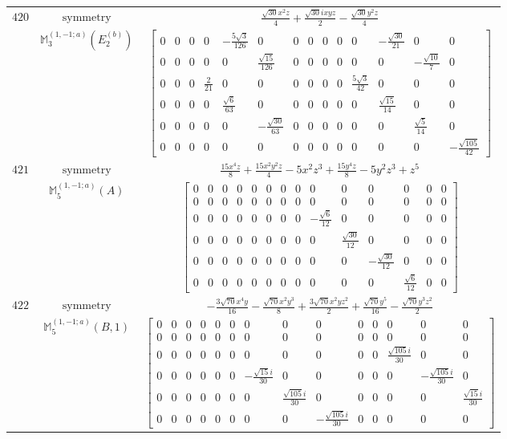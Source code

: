 \documentclass[fleqn,8pt,landscape]{jsarticle}
\begin{document}
\begin{longtable}{ccc}
$ 420 $ & $ \text{symmetry} $ & $ \frac{\sqrt{30} x^{2} z}{4} + \frac{\sqrt{30} i x y z}{2} - \frac{\sqrt{30} y^{2} z}{4} $ \\
$  $ & $ \mathbb{M}_{3}^{(1,-1;a)}(E_{2}^{(b)}) $ & $ \begin{bmatrix} 0 & 0 & 0 & 0 & - \frac{5 \sqrt{3}}{126} & 0 & 0 & 0 & 0 & 0 & 0 & - \frac{\sqrt{30}}{21} & 0 & 0 \\ 0 & 0 & 0 & 0 & 0 & \frac{\sqrt{15}}{126} & 0 & 0 & 0 & 0 & 0 & 0 & - \frac{\sqrt{10}}{7} & 0 \\ 0 & 0 & 0 & \frac{2}{21} & 0 & 0 & 0 & 0 & 0 & 0 & \frac{5 \sqrt{3}}{42} & 0 & 0 & 0 \\ 0 & 0 & 0 & 0 & \frac{\sqrt{6}}{63} & 0 & 0 & 0 & 0 & 0 & 0 & \frac{\sqrt{15}}{14} & 0 & 0 \\ 0 & 0 & 0 & 0 & 0 & - \frac{\sqrt{30}}{63} & 0 & 0 & 0 & 0 & 0 & 0 & \frac{\sqrt{5}}{14} & 0 \\ 0 & 0 & 0 & 0 & 0 & 0 & 0 & 0 & 0 & 0 & 0 & 0 & 0 & - \frac{\sqrt{105}}{42} \end{bmatrix} $ \\ \hline
$ 421 $ & $ \text{symmetry} $ & $ \frac{15 x^{4} z}{8} + \frac{15 x^{2} y^{2} z}{4} - 5 x^{2} z^{3} + \frac{15 y^{4} z}{8} - 5 y^{2} z^{3} + z^{5} $ \\
$  $ & $ \mathbb{M}_{5}^{(1,-1;a)}(A) $ & $ \begin{bmatrix} 0 & 0 & 0 & 0 & 0 & 0 & 0 & 0 & 0 & 0 & 0 & 0 & 0 & 0 \\ 0 & 0 & 0 & 0 & 0 & 0 & 0 & 0 & 0 & 0 & 0 & 0 & 0 & 0 \\ 0 & 0 & 0 & 0 & 0 & 0 & 0 & 0 & - \frac{\sqrt{6}}{12} & 0 & 0 & 0 & 0 & 0 \\ 0 & 0 & 0 & 0 & 0 & 0 & 0 & 0 & 0 & \frac{\sqrt{30}}{12} & 0 & 0 & 0 & 0 \\ 0 & 0 & 0 & 0 & 0 & 0 & 0 & 0 & 0 & 0 & - \frac{\sqrt{30}}{12} & 0 & 0 & 0 \\ 0 & 0 & 0 & 0 & 0 & 0 & 0 & 0 & 0 & 0 & 0 & \frac{\sqrt{6}}{12} & 0 & 0 \end{bmatrix} $ \\ \hline
$ 422 $ & $ \text{symmetry} $ & $ - \frac{3 \sqrt{70} x^{4} y}{16} - \frac{\sqrt{70} x^{2} y^{3}}{8} + \frac{3 \sqrt{70} x^{2} y z^{2}}{2} + \frac{\sqrt{70} y^{5}}{16} - \frac{\sqrt{70} y^{3} z^{2}}{2} $ \\
$  $ & $ \mathbb{M}_{5}^{(1,-1;a)}(B,1) $ & $ \begin{bmatrix} 0 & 0 & 0 & 0 & 0 & 0 & 0 & 0 & 0 & 0 & 0 & 0 & 0 & 0 \\ 0 & 0 & 0 & 0 & 0 & 0 & 0 & 0 & 0 & 0 & 0 & 0 & 0 & 0 \\ 0 & 0 & 0 & 0 & 0 & 0 & 0 & 0 & 0 & 0 & 0 & \frac{\sqrt{105} i}{30} & 0 & 0 \\ 0 & 0 & 0 & 0 & 0 & 0 & - \frac{\sqrt{15} i}{30} & 0 & 0 & 0 & 0 & 0 & - \frac{\sqrt{105} i}{30} & 0 \\ 0 & 0 & 0 & 0 & 0 & 0 & 0 & \frac{\sqrt{105} i}{30} & 0 & 0 & 0 & 0 & 0 & \frac{\sqrt{15} i}{30} \\ 0 & 0 & 0 & 0 & 0 & 0 & 0 & 0 & - \frac{\sqrt{105} i}{30} & 0 & 0 & 0 & 0 & 0 \end{bmatrix} $ \\ \hline

\end{longtable}
\end{document}
